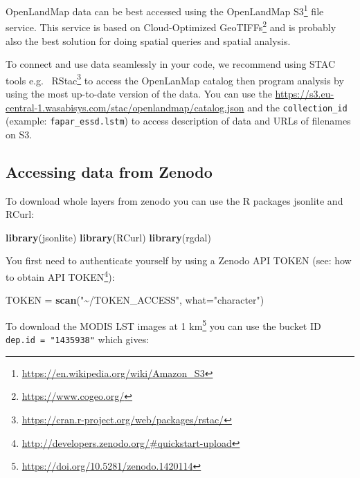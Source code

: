 \documentclass[
  graybox,natbib,nospthms]{svmono}
\newenvironment{Shaded}{\begin{snugshade}}{\end{snugshade}}
\newcommand{\AttributeTok}[1]{\textcolor[rgb]{0.27,0.27,0.27}{#1}}
\newcommand{\FunctionTok}[1]{\textcolor[rgb]{0.27,0.27,0.27}{\textbf{#1}}}
\newcommand{\NormalTok}[1]{#1}
\newcommand{\OtherTok}[1]{\textcolor[rgb]{0.37,0.37,0.37}{#1}}
\newcommand{\StringTok}[1]{\textcolor[rgb]{0.5,0.5,0.5}{#1}}
\renewcommand{\href}[2]{#2 (\url{#1})}
\renewcommand{\href}[2]{#2\footnote{\url{#1}}}
\begin{document}
OpenLandMap data can be best accessed using the OpenLandMap \href{https://en.wikipedia.org/wiki/Amazon_S3}{S3} file service.
This service is based on \href{https://www.cogeo.org/}{Cloud-Optimized GeoTIFFs} and is
probably also the best solution for doing spatial queries and spatial analysis.

To connect and use data seamlessly in your code, we recommend using STAC tools e.g.~
\href{https://cran.r-project.org/web/packages/rstac/}{RStac} to access the OpenLanMap catalog
then program analysis by using the most up-to-date version of the data. You
can use the \url{https://s3.eu-central-1.wasabisys.com/stac/openlandmap/catalog.json} and
the \texttt{collection\_id} (example: \texttt{fapar\_essd.lstm}) to access description of data and
URLs of filenames on S3.

\hypertarget{accessing-data-from-zenodo}{%
\subsection{Accessing data from Zenodo}\label{accessing-data-from-zenodo}}

To download whole layers from zenodo you can use the R packages jsonlite and RCurl:

\begin{Shaded}
\begin{Highlighting}[]
\FunctionTok{library}\NormalTok{(jsonlite)}
\FunctionTok{library}\NormalTok{(RCurl)}
\FunctionTok{library}\NormalTok{(rgdal)}
\end{Highlighting}
\end{Shaded}

You first need to authenticate yourself by using a Zenodo API TOKEN
(see: \href{http://developers.zenodo.org/\#quickstart-upload}{how to obtain API TOKEN}):

\begin{Shaded}
\begin{Highlighting}[]
\NormalTok{TOKEN }\OtherTok{=} \FunctionTok{scan}\NormalTok{(}\StringTok{"\textasciitilde{}/TOKEN\_ACCESS"}\NormalTok{, }\AttributeTok{what=}\StringTok{"character"}\NormalTok{)}
\end{Highlighting}
\end{Shaded}

To download the \href{https://doi.org/10.5281/zenodo.1420114}{MODIS LST images at 1 km} you can use the bucket ID \texttt{dep.id\ =\ "1435938"} which gives:
\end{document}
